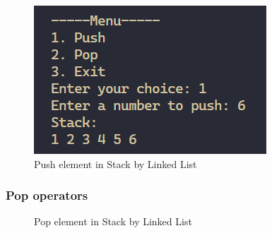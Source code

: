 \begin{figure}[H]
    \centering
    \includegraphics{img/img7.PNG}
    \caption{Push element in Stack by Linked List}
    \label{fig:stackLinkedListPush}
\end{figure}

\subsubsection{Pop operators}

\begin{figure}[H]
    \centering
    \qquad
    \caption{Pop element in Stack by Linked List}%
    \label{fig:stackLinkedListPop}%
\end{figure}

